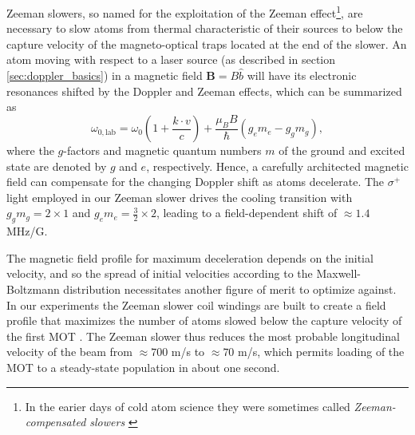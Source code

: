 	Zeeman slowers, so named for the exploitation of the Zeeman effect\footnote{In the earier days of cold atom science they were sometimes called \emph{Zeeman-compensated slowers} \cite{Mastwijk98}}, are necessary to slow atoms from thermal characteristic of their sources to below the capture velocity of the magneto-optical traps located at the end of the slower.
	An atom moving with respect to a laser source (as described in section \ref{sec:doppler_basics}) in a magnetic field $\textbf{B} = B\hat{b}$ will have its electronic resonances shifted by the Doppler and Zeeman effects, which can be summarized as
	\begin{equation}
		\omega_{0,\text{lab}} = \omega_{0}\left(1 + \frac{k\cdot v}{c}\right) + \frac{\mu_B B}{\hbar}\left(g_e m_e - g_g m_g\right),
	\end{equation}
	where the $g$-factors and magnetic quantum numbers $m$ of the ground and excited state are denoted by $g$ and $e$, respectively. 
	Hence, a carefully architected magnetic field can compensate for the changing Doppler shift as atoms decelerate.
	The $\sigma^+$ light employed in our Zeeman slower drives the cooling transition with $g_g m_g = 2\times 1$ and $g_e m_e = \frac{3}{2}\times2$, leading to a field-dependent shift of $\approx1.4$ MHz/G.
	
	The magnetic field profile for maximum deceleration depends on the initial velocity, and so the spread of initial velocities according to the Maxwell-Boltzmann distribution necessitates another figure of merit to optimize against.
	In our experiments the Zeeman slower coil windings are built to create a field profile that maximizes the number of atoms slowed below the capture velocity of the first MOT \cite{Dedman04}.
	The Zeeman slower thus reduces the most probable longitudinal velocity of the beam from $\approx700$ m/s to $\approx70$ m/s, which permits loading of the MOT to a steady-state population in about one second.


